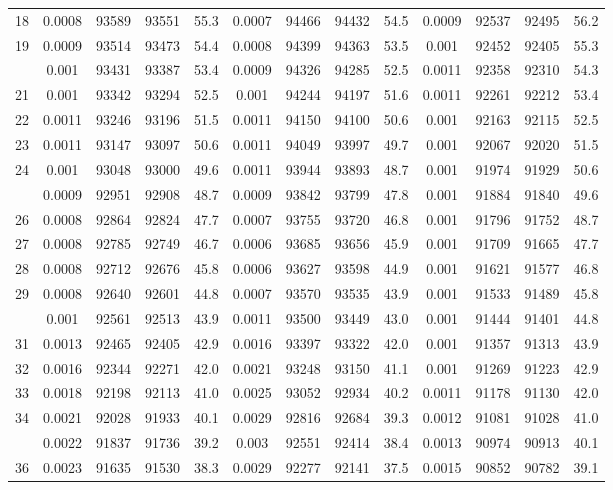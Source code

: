 \documentclass[
  14pt,
]{article}
\begin{document}
\begin{longtable}[t]{lcccccccccccc}
18 & 0.0008 & 93589 & 93551 & 55.3 & 0.0007 & 94466 & 94432 & 54.5 & 0.0009 & 92537 & 92495 & 56.2\\
19 & 0.0009 & 93514 & 93473 & 54.4 & 0.0008 & 94399 & 94363 & 53.5 & 0.001 & 92452 & 92405 & 55.3\\
\addlinespace
20 & 0.001 & 93431 & 93387 & 53.4 & 0.0009 & 94326 & 94285 & 52.5 & 0.0011 & 92358 & 92310 & 54.3\\
21 & 0.001 & 93342 & 93294 & 52.5 & 0.001 & 94244 & 94197 & 51.6 & 0.0011 & 92261 & 92212 & 53.4\\
22 & 0.0011 & 93246 & 93196 & 51.5 & 0.0011 & 94150 & 94100 & 50.6 & 0.001 & 92163 & 92115 & 52.5\\
23 & 0.0011 & 93147 & 93097 & 50.6 & 0.0011 & 94049 & 93997 & 49.7 & 0.001 & 92067 & 92020 & 51.5\\
24 & 0.001 & 93048 & 93000 & 49.6 & 0.0011 & 93944 & 93893 & 48.7 & 0.001 & 91974 & 91929 & 50.6\\
\addlinespace
25 & 0.0009 & 92951 & 92908 & 48.7 & 0.0009 & 93842 & 93799 & 47.8 & 0.001 & 91884 & 91840 & 49.6\\
26 & 0.0008 & 92864 & 92824 & 47.7 & 0.0007 & 93755 & 93720 & 46.8 & 0.001 & 91796 & 91752 & 48.7\\
27 & 0.0008 & 92785 & 92749 & 46.7 & 0.0006 & 93685 & 93656 & 45.9 & 0.001 & 91709 & 91665 & 47.7\\
28 & 0.0008 & 92712 & 92676 & 45.8 & 0.0006 & 93627 & 93598 & 44.9 & 0.001 & 91621 & 91577 & 46.8\\
29 & 0.0008 & 92640 & 92601 & 44.8 & 0.0007 & 93570 & 93535 & 43.9 & 0.001 & 91533 & 91489 & 45.8\\
\addlinespace
30 & 0.001 & 92561 & 92513 & 43.9 & 0.0011 & 93500 & 93449 & 43.0 & 0.001 & 91444 & 91401 & 44.8\\
31 & 0.0013 & 92465 & 92405 & 42.9 & 0.0016 & 93397 & 93322 & 42.0 & 0.001 & 91357 & 91313 & 43.9\\
32 & 0.0016 & 92344 & 92271 & 42.0 & 0.0021 & 93248 & 93150 & 41.1 & 0.001 & 91269 & 91223 & 42.9\\
33 & 0.0018 & 92198 & 92113 & 41.0 & 0.0025 & 93052 & 92934 & 40.2 & 0.0011 & 91178 & 91130 & 42.0\\
34 & 0.0021 & 92028 & 91933 & 40.1 & 0.0029 & 92816 & 92684 & 39.3 & 0.0012 & 91081 & 91028 & 41.0\\
\addlinespace
35 & 0.0022 & 91837 & 91736 & 39.2 & 0.003 & 92551 & 92414 & 38.4 & 0.0013 & 90974 & 90913 & 40.1\\
36 & 0.0023 & 91635 & 91530 & 38.3 & 0.0029 & 92277 & 92141 & 37.5 & 0.0015 & 90852 & 90782 & 39.1\\

\end{longtable}
\end{document}
